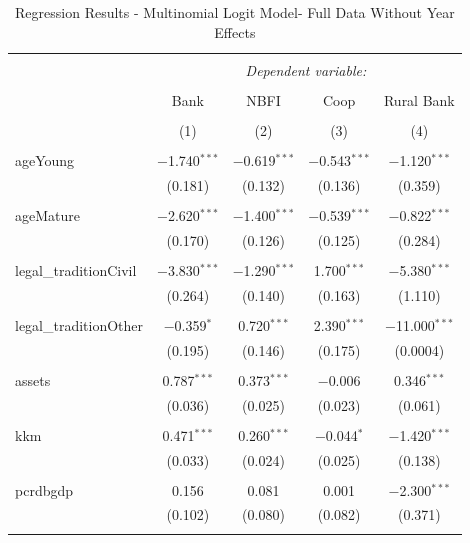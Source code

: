 \documentclass[a4paper, nobind]{templates/ociamthesis}
\begin{document}
\begin{table}[!htbp] \centering 
  \caption{Regression Results - Multinomial Logit Model- Full Data Without Year Effects} 
  \label{} 
\footnotesize 
\begin{tabular}{@{\extracolsep{5pt}}lcccc} 
\\[-1.8ex]\hline 
\hline \\[-1.8ex] 
 & \multicolumn{4}{c}{\textit{Dependent variable:}} \\ 
\cline{2-5} 
\\[-1.8ex] & Bank & NBFI & Coop & Rural Bank \\ 
\\[-1.8ex] & (1) & (2) & (3) & (4)\\ 
\hline \\[-1.8ex] 
 ageYoung & $-$1.740$^{***}$ & $-$0.619$^{***}$ & $-$0.543$^{***}$ & $-$1.120$^{***}$ \\ 
  & (0.181) & (0.132) & (0.136) & (0.359) \\ 
  & & & & \\ 
 ageMature & $-$2.620$^{***}$ & $-$1.400$^{***}$ & $-$0.539$^{***}$ & $-$0.822$^{***}$ \\ 
  & (0.170) & (0.126) & (0.125) & (0.284) \\ 
  & & & & \\ 
 legal\_traditionCivil & $-$3.830$^{***}$ & $-$1.290$^{***}$ & 1.700$^{***}$ & $-$5.380$^{***}$ \\ 
  & (0.264) & (0.140) & (0.163) & (1.110) \\ 
  & & & & \\ 
 legal\_traditionOther & $-$0.359$^{*}$ & 0.720$^{***}$ & 2.390$^{***}$ & $-$11.000$^{***}$ \\ 
  & (0.195) & (0.146) & (0.175) & (0.0004) \\ 
  & & & & \\ 
 assets & 0.787$^{***}$ & 0.373$^{***}$ & $-$0.006 & 0.346$^{***}$ \\ 
  & (0.036) & (0.025) & (0.023) & (0.061) \\ 
  & & & & \\ 
 kkm & 0.471$^{***}$ & 0.260$^{***}$ & $-$0.044$^{*}$ & $-$1.420$^{***}$ \\ 
  & (0.033) & (0.024) & (0.025) & (0.138) \\ 
  & & & & \\ 
 pcrdbgdp & 0.156 & 0.081 & 0.001 & $-$2.300$^{***}$ \\ 
  & (0.102) & (0.080) & (0.082) & (0.371) \\ 
  & & & & \\ 

\end{tabular}
\end{table}
\end{document}
